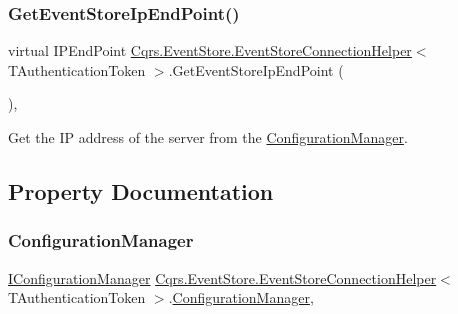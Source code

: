 \subsubsection{\texorpdfstring{Get\+Event\+Store\+Ip\+End\+Point()}{GetEventStoreIpEndPoint()}}
{\footnotesize\ttfamily virtual I\+P\+End\+Point \hyperlink{classCqrs_1_1EventStore_1_1EventStoreConnectionHelper}{Cqrs.\+Event\+Store.\+Event\+Store\+Connection\+Helper}$<$ T\+Authentication\+Token $>$.Get\+Event\+Store\+Ip\+End\+Point (\begin{DoxyParamCaption}{ }\end{DoxyParamCaption})\hspace{0.3cm}{\ttfamily [protected]}, {\ttfamily [virtual]}}



Get the IP address of the server from the \hyperlink{classCqrs_1_1EventStore_1_1EventStoreConnectionHelper_aa518bbaa1cd7d75a57429c3cf4dd4f96_aa518bbaa1cd7d75a57429c3cf4dd4f96}{Configuration\+Manager}. 



\subsection{Property Documentation}
\mbox{\label{classCqrs_1_1EventStore_1_1EventStoreConnectionHelper_aa518bbaa1cd7d75a57429c3cf4dd4f96_aa518bbaa1cd7d75a57429c3cf4dd4f96}} 
\subsubsection{\texorpdfstring{Configuration\+Manager}{ConfigurationManager}}
{\footnotesize\ttfamily \hyperlink{interfaceCqrs_1_1Configuration_1_1IConfigurationManager}{I\+Configuration\+Manager} \hyperlink{classCqrs_1_1EventStore_1_1EventStoreConnectionHelper}{Cqrs.\+Event\+Store.\+Event\+Store\+Connection\+Helper}$<$ T\+Authentication\+Token $>$.\hyperlink{classCqrs_1_1Configuration_1_1ConfigurationManager}{Configuration\+Manager}\hspace{0.3cm}{\ttfamily [get]}, {\ttfamily [protected]}}



